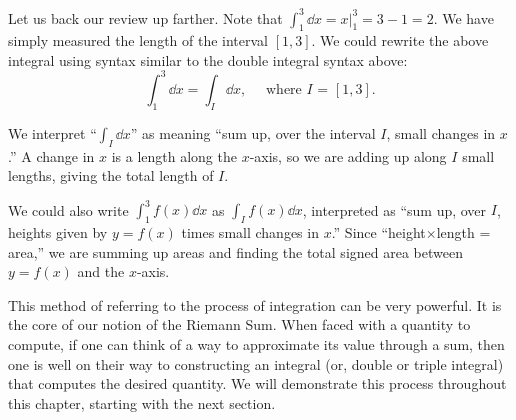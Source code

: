 Let us back our review up farther. Note that $\int_1^3\dd x = x\big|_1^3 = 3-1 = 2$. We have simply measured the length of the interval $[1,3]$. We could rewrite the above integral using syntax similar to the double integral syntax above:
\[\int_1^3\dd x = \int_I\dd x,\quad \text{ where $I$ = $[1,3]$}.\]

We interpret ``$\int_I\dd x$'' as meaning ``sum up, over the interval $I$, small changes in $x$.'' A change in $x$ is a length along the $x$-axis, so we are adding up along $I$ small lengths, giving the total length of $I$. 

We could also write $\int_1^3f(x)\dd x$ as $\int_I f(x)\dd x$, interpreted as ``sum up, over $I$, heights given by $y = f(x)$ times small changes in $x$.'' Since ``height$\times$length = area,'' we are summing up areas and finding the total signed area between $y = f(x)$ and the $x$-axis. 

This method of referring to the process of integration can be very powerful. It is the core of our notion of the Riemann Sum. When faced with a quantity to compute, if one can think of a way to approximate its value through a sum, then one is well on their way to constructing an integral (or, double or triple integral) that computes the desired quantity. We will demonstrate this process throughout this chapter, starting with the next section.

